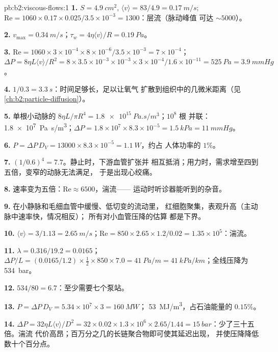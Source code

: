 \begin{solution}{pb:b2:viscous-flows:1}
\textbf{1.} $S = \qty{4.9}{cm^2}$, $\langle v\rangle = 83/4.9 = \qty{0.17}{m/s}$; $\mathrm{Re}
= 1060 \times 0.17 \times 0.025/3.5 \times 10^{-3} = 1300$：层流（脉动峰值
可达 $\sim 5000$）。

\textbf{2.} $v_{\max} = \qty{0.34}{m/s}$；$\tau_w = 4\eta\langle v\rangle/R = \qty{0.19}{Pa}$。

\textbf{3.} $\mathrm{Re} = 1060 \times 3 \times 10^{-4} \times 8 \times 10^{-6}/3.5 \times 10^{-3} =
7 \times 10^{-4}$；$\Delta P = 8\eta L\langle v\rangle/R^2 = 8 \times 3.5 \times 10^{-3} \times 10^{-3}
\times 3 \times 10^{-4}/1.6 \times 10^{-11} = \qty{525}{Pa} = \qty{3.9}{mmHg}$。

\textbf{4.} $1/0.3 = \qty{3.3}{s}$：时间足够长，足以让氧气
扩散到组织中的几微米距离（见\cref{ch:b2:particle-diffusion}）。

\textbf{5.} 单根小动脉的 $8\eta L/\pi R^4 = \qty{1.8e15}{Pa.s/m^3}$；$10^8$ 根
并联：\qty{1.8e7}{Pa.s/m^3}；$\Delta P = 1.8 \times 10^7 \times 8.3 \times 10^{-5} =
\qty{1.5}{kPa} = \qty{11}{mmHg}$。

\textbf{6.} $P = \Delta P\,D_V = 13000 \times 8.3 \times 10^{-5} = \qty{1.1}{W}$，约占
人体功率的 $1\%$。

\textbf{7.} $(1/0.6)^4 = 7.7$。静止时，下游血管扩张并
相互抵消；用力时，需求增至四到五倍，变窄的动脉无法满足，
于是出现心绞痛。

\textbf{8.} 速率变为五倍：$\mathrm{Re} \approx 6500$，湍流——
运动时听诊器能听到的杂音。

\textbf{9.} 在小静脉和毛细血管中缓慢、低切变的流动里，
红细胞聚集，表观升高（主动脉中速率快，情况相反）；
所有对小血管压降的估算
都是下界。

\textbf{10.} $\langle v\rangle = 3/1.13 = \qty{2.65}{m/s}$；$\mathrm{Re} = 850 \times 2.65 \times
1.2/0.02 = 1.35 \times 10^5$：湍流。

\textbf{11.} $\lambda = 0.316/19.2 = 0.0165$；$\Delta P/L = (0.0165/1.2) \times \tfrac12 \times
850 \times 7.0 = \qty{41}{Pa/m} = \qty{41}{kPa/km}$；全线压降为 \qty{534}{bar}。

\textbf{12.} $534/80 = 6.7$：至少需要七个泵站。

\textbf{13.} $P = \Delta P\,D_V = 5.34 \times 10^7 \times 3 = \qty{160}{MW}$；
\qty{53}{MJ/m^3}，占石油能量的 $0.15\%$。

\textbf{14.} $\Delta P = 32\eta L\langle v\rangle/D^2 = 32 \times 0.02 \times 1.3 \times 10^6
\times 2.65/1.44 = \qty{15}{bar}$：少了三十五倍。湍流
代价高昂；百万分之几的长链聚合物即可使其延迟出现，
并使压降降低数十个百分点。


\end{solution}
